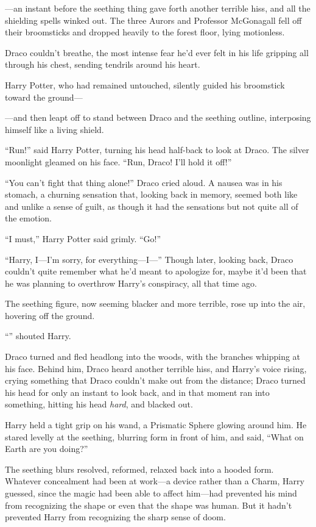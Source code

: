 \begin{em}
—an instant before the seething thing gave forth another terrible hiss, and all the shielding spells winked out. The three Aurors and Professor McGonagall fell off their broomsticks and dropped heavily to the forest floor, lying motionless.

Draco couldn’t breathe, the most intense fear he’d ever felt in his life gripping all through his chest, sending tendrils around his heart.

Harry Potter, who had remained untouched, silently guided his broomstick toward the ground—

—and then leapt off to stand between Draco and the seething outline, interposing himself like a living shield.

“Run!” said Harry Potter, turning his head half-back to look at Draco. The silver moonlight gleamed on his face. “Run, Draco! I’ll hold it off!”

“You can’t fight that thing alone!” Draco cried aloud. A nausea was in his stomach, a churning sensation that, looking back in memory, seemed both like and unlike a sense of guilt, as though it had the sensations but not quite all of the emotion.

“I must,” Harry Potter said grimly. “Go!”

“Harry, I—I’m sorry, for everything—I—” Though later, looking back, Draco couldn’t quite remember what he’d meant to apologize for, maybe it’d been that he was planning to overthrow Harry’s conspiracy, all that time ago.

The seething figure, now seeming blacker and more terrible, rose up into the air, hovering off the ground.

“” shouted Harry.

Draco turned and fled headlong into the woods, with the branches whipping at his face. Behind him, Draco heard another terrible hiss, and Harry’s voice rising, crying something that Draco couldn’t make out from the distance; Draco turned his head for only an instant to look back, and in that moment ran into something, hitting his head \emph{hard}, and blacked out.
\end{em}

\later

Harry held a tight grip on his wand, a Prismatic Sphere glowing around him. He stared levelly at the seething, blurring form in front of him, and said, “What on Earth are you doing?”

The seething blurs resolved, reformed, relaxed back into a hooded form. Whatever concealment had been at work—a device rather than a Charm, Harry guessed, since the magic had been able to affect him—had prevented his mind from recognizing the shape or even that the shape was human. But it hadn’t prevented Harry from recognizing the sharp sense of doom.

